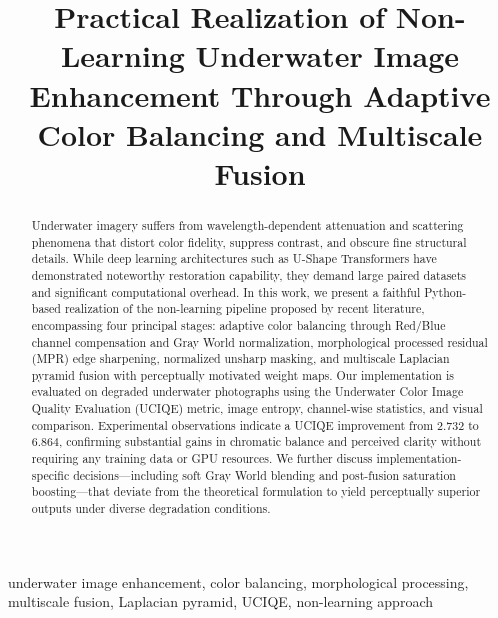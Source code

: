\documentclass[conference]{IEEEtran}
\begin{document}
\title{Practical Realization of Non-Learning Underwater Image Enhancement Through Adaptive Color Balancing and Multiscale Fusion}

\author{
}

\maketitle

\begin{abstract}
Underwater imagery suffers from wavelength-dependent attenuation and scattering phenomena that distort color fidelity, suppress contrast, and obscure fine structural details. While deep learning architectures such as U-Shape Transformers have demonstrated noteworthy restoration capability, they demand large paired datasets and significant computational overhead. In this work, we present a faithful Python-based realization of the non-learning pipeline proposed by recent literature, encompassing four principal stages: adaptive color balancing through Red/Blue channel compensation and Gray World normalization, morphological processed residual (MPR) edge sharpening, normalized unsharp masking, and multiscale Laplacian pyramid fusion with perceptually motivated weight maps. Our implementation is evaluated on degraded underwater photographs using the Underwater Color Image Quality Evaluation (UCIQE) metric, image entropy, channel-wise statistics, and visual comparison. Experimental observations indicate a UCIQE improvement from 2.732 to 6.864, confirming substantial gains in chromatic balance and perceived clarity without requiring any training data or GPU resources. We further discuss implementation-specific decisions---including soft Gray World blending and post-fusion saturation boosting---that deviate from the theoretical formulation to yield perceptually superior outputs under diverse degradation conditions.
\end{abstract}

\begin{IEEEkeywords}
underwater image enhancement, color balancing, morphological processing, multiscale fusion, Laplacian pyramid, UCIQE, non-learning approach
\end{IEEEkeywords}
\end{document}
